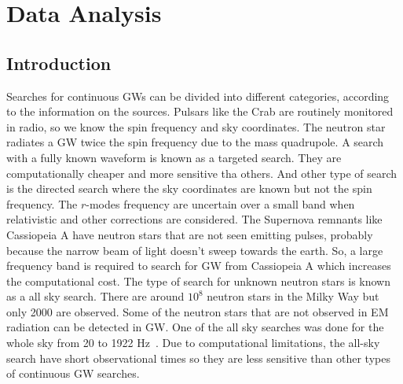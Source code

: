 \documentclass{ttuthes2007}
\begin{document}

\chapter{\textbf{Data Analysis}}
\section{Introduction}
Searches for continuous \acp{GW} can be divided into different categories,
according to the information on the sources. Pulsars like the Crab are routinely
monitored in radio, so we know the spin frequency and sky coordinates. The
neutron star radiates a \ac{GW} twice the spin frequency due to the mass
quadrupole. A search with a fully known waveform is known as a targeted search.
They are computationally cheaper and more sensitive tha others. And other type
of search is the directed search where the sky coordinates are known but not the
spin frequency. The $r$-modes frequency are uncertain over a small band when
relativistic and other corrections are considered. The Supernova remnants like
Cassiopeia A have neutron stars that are not seen emitting pulses, probably
because the narrow beam of light doesn't sweep towards the earth. So, a large
frequency band is required to search for \ac{GW} from Cassiopeia A which
increases the computational cost. The type of search for unknown neutron stars
is known as a all sky search. There are around $10^8$ neutron stars in the Milky
Way but only 2000 are observed. Some of the neutron stars that are not observed
in \ac{EM} radiation can be detected in \ac{GW}. One of the all sky searches
was done for the whole sky from 20 to 1922 Hz~\cite{Abbott_2019a}. Due to
computational limitations, the all-sky search have short observational times so
they are less sensitive than other types of continuous \ac{GW} searches.
\end{document}
